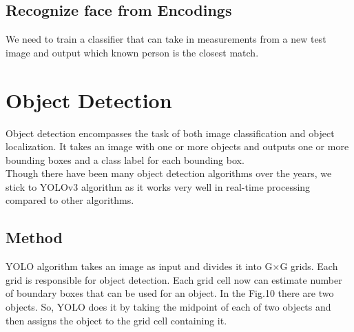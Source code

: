 \documentclass[12pt]{report}
\begin{document}
\subsection{Recognize face from Encodings}
We need to train a classifier that can take in measurements from a new test image and output which known person is the closest match.
\section{Object Detection}
Object detection encompasses the task of both image classification and object localization. It takes an image with one or more objects and outputs one or more bounding boxes and a class label for each bounding box.\\

Though there have been many object detection algorithms over the years, we stick to YOLOv3 algorithm as it works very well in real-time processing compared to other algorithms.
\subsection{Method}
YOLO algorithm takes an image as input and divides it into G×G grids. Each grid is responsible for object detection. Each grid cell now can estimate number of boundary boxes that can be used for an object. In the Fig.10  there are two objects. So, YOLO does it by taking the midpoint of each of two objects and then assigns the object to the grid cell containing it. \\
\end{document}
